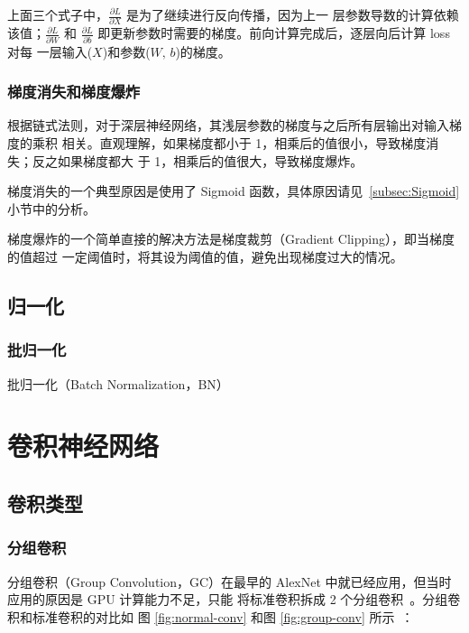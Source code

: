 上面三个式子中，$\frac{\partial L}{\partial X}$ 是为了继续进行反向传播，因为上一
层参数导数的计算依赖该值；$\frac{\partial L}{\partial W}$ 和 $\frac{\partial
  L}{\partial b}$ 即更新参数时需要的梯度。前向计算完成后，逐层向后计算 loss 对每
一层输入($X$)和参数($W, \, b$)的梯度。

\subsection{梯度消失和梯度爆炸}
\label{subsec:gradient-vanish-explosion}
根据链式法则，对于深层神经网络，其浅层参数的梯度与之后所有层输出对输入梯度的乘积
相关。直观理解，如果梯度都小于 1，相乘后的值很小，导致梯度消失；反之如果梯度都大
于 1，相乘后的值很大，导致梯度爆炸。

梯度消失的一个典型原因是使用了 Sigmoid 函数，具体原因请见~\ref{subsec:Sigmoid}小节中的分析。

梯度爆炸的一个简单直接的解决方法是梯度裁剪（Gradient Clipping），即当梯度的值超过
一定阈值时，将其设为阈值的值，避免出现梯度过大的情况。

\section{归一化}

\subsection{批归一化}
\label{sub:BN}

批归一化（Batch Normalization，BN）

\chapter{卷积神经网络}

\section{卷积类型}

\subsection{分组卷积}

分组卷积（Group Convolution，GC）在最早的 AlexNet 中就已经应用，但当时应用的原因是 GPU 计算能力不足，只能
将标准卷积拆成 2 个分组卷积~。分组卷积和标准卷积的对比如
图 \ref{fig:normal-conv} 和图 \ref{fig:group-conv} 所示~：

